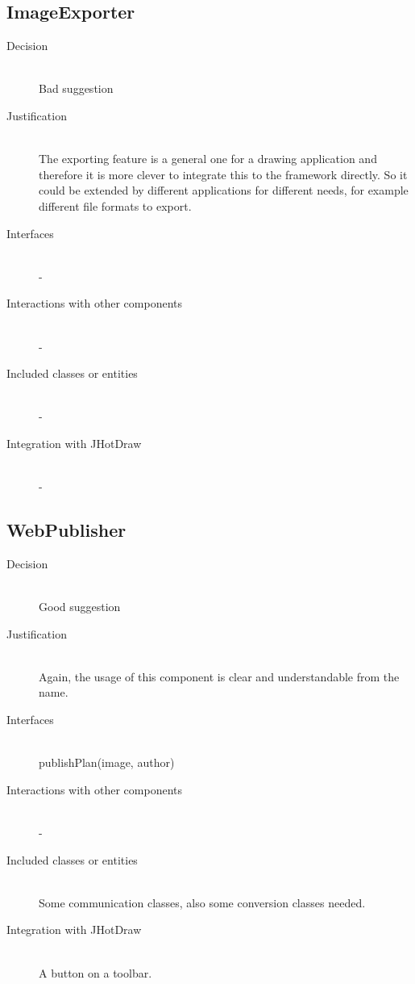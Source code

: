 
\subsection{ImageExporter}
	\begin{description}
		\item[Decision] \hfill \\ Bad suggestion
		\item[Justification] \hfill \\ The exporting feature is a general one for a drawing application and therefore it is more clever to integrate this to the framework directly. So it could be extended by different applications for different needs, for example different file formats to export.
		\item[Interfaces] \hfill \\ -
		\item[Interactions with other components] \hfill \\ -
		\item[Included classes or entities] \hfill \\ -
		\item[Integration with JHotDraw] \hfill \\ -
	\end{description}

\subsection{WebPublisher}
	\begin{description}
		\item[Decision] \hfill \\ Good suggestion
		\item[Justification] \hfill \\ Again, the usage of this component is clear and understandable from the name.
		\item[Interfaces] \hfill \\ publishPlan(image, author)
		\item[Interactions with other components] \hfill \\ -
		\item[Included classes or entities] \hfill \\ Some communication classes, also some conversion classes needed.
		\item[Integration with JHotDraw] \hfill \\ A button on a toolbar.
	\end{description}

